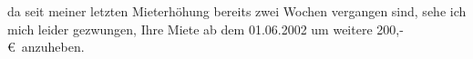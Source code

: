 \documentclass[11pt]{g-brief}
\begin{document}
\begin{g-brief}
da seit meiner letzten Mieterhöhung bereits zwei Wochen vergangen sind, sehe ich mich leider gezwungen,
Ihre Miete ab dem 01.06.2002 um weitere 200,-\euro\ anzuheben.

\end{g-brief}
\end{document}
